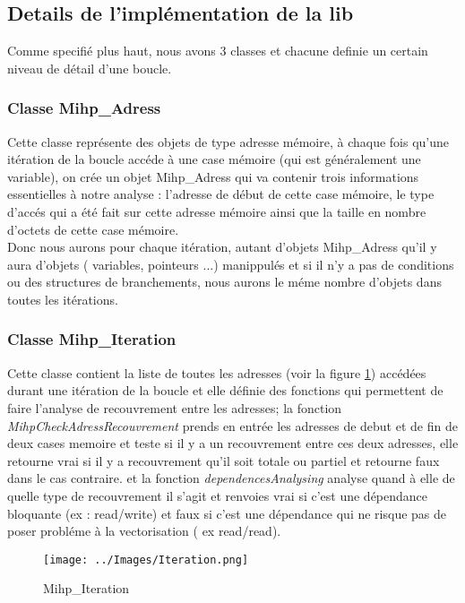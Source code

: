 \documentclass[12pt,french]{article}
\begin{document}
\subsection{\color{blue} Details de l'implémentation de la lib}

Comme specifié plus haut, nous avons 3 classes et chacune definie un certain niveau de détail d'une boucle.

\subsubsection{\color{blue} Classe Mihp\_Adress}
\label{ClasseMihpAddress}
  Cette classe représente des objets de type adresse mémoire, à chaque fois qu'une itération de la boucle accéde à une case mémoire (qui est généralement une variable), on crée un objet Mihp\_Adress qui va contenir trois informations essentielles à notre analyse : l'adresse de début de cette case mémoire, le type d'accés qui a été fait sur cette adresse mémoire ainsi que la taille en nombre d'octets de cette case mémoire. \\
  Donc nous aurons pour chaque itération, autant d'objets Mihp\_Adress qu'il y aura d'objets ( variables, pointeurs ...) manippulés et si il n'y a pas de conditions ou des structures de branchements, nous aurons le méme nombre d'objets dans toutes les itérations.\\
  \subsubsection{\color{blue} Classe Mihp\_Iteration}
Cette classe contient la liste de toutes les adresses (voir la figure \ref{Iteration}) accédées durant une itération de la boucle et elle définie des fonctions qui permettent 
de faire l'analyse de recouvrement entre les adresses; la fonction \textit{ MihpCheckAdressRecouvrement} prends en entrée les adresses de debut et de fin de deux cases memoire et teste si il y a un recouvrement entre ces deux adresses, elle retourne vrai si il y a recouvrement qu'il soit totale ou partiel et retourne faux dans le cas contraire. et la fonction \textit{dependencesAnalysing} analyse quand à elle de quelle type de recouvrement il s'agit et renvoies vrai si c'est une dépendance bloquante (ex : read/write) et faux si c'est une dépendance qui ne risque pas de poser probléme à la vectorisation ( ex read/read). 

\begin{figure} %
	\begin{center}
	
		\texttt{[image: ../Images/Iteration.png]}
	\end{center}
	\caption{Mihp\_Iteration}
	\label{Iteration}
\end{figure}
\end{document}
